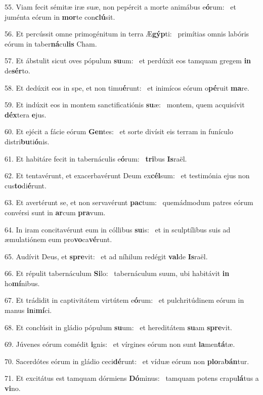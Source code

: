 55. Viam fecit sémitæ iræ suæ, non pepércit a morte animábus e\textbf{ó}rum: \ast\  et juménta eórum in \textbf{mor}te con\textbf{clú}sit.\

56. Et percússit omne primogénitum in terra Æ\textbf{gýp}ti: \ast\  primítias omnis labóris eórum in taber\textbf{ná}cu\textbf{lis} Cham.\

57. Et ábstulit sicut oves pópulum \textbf{su}um: \ast\  et perdúxit eos tamquam gregem \textbf{in} de\textbf{sér}to.\

58. Et dedúxit eos in spe, et non timu\textbf{é}runt: \ast\  et inimícos eórum o\textbf{pé}ruit \textbf{ma}re.\

59. Et indúxit eos in montem sanctificatiónis \textbf{su}æ: \ast\  montem, quem acquisívit \textbf{déx}tera \textbf{e}jus.\

60. Et ejécit a fácie eórum \textbf{Gen}tes: \ast\  et sorte divísit eis terram in funículo distri\textbf{bu}ti\textbf{ó}nis.\

61. Et habitáre fecit in tabernáculis e\textbf{ó}rum: \ast\  \textbf{tri}bus \textbf{Is}raël.\

62. Et tentavérunt, et exacerbavérunt Deum ex\textbf{cél}sum: \ast\  et testimónia ejus non cus\textbf{to}di\textbf{é}runt.\

63. Et avertérunt se, et non servavérunt \textbf{pac}tum: \ast\  quemádmodum patres eórum convérsi sunt in \textbf{ar}cum \textbf{pra}vum.\

64. In iram concitavérunt eum in cóllibus \textbf{su}is: \ast\  et in sculptílibus suis ad æmulatiónem eum pro\textbf{vo}ca\textbf{vé}runt.\

65. Audívit Deus, et \textbf{spre}vit: \ast\  et ad níhilum redégit \textbf{val}de \textbf{Is}raël.\

66. Et répulit tabernáculum \textbf{Si}lo: \ast\  tabernáculum suum, ubi habitávit \textbf{in} ho\textbf{mí}nibus.\

67. Et trádidit in captivitátem virtútem e\textbf{ó}rum: \ast\  et pulchritúdinem eórum in manus \textbf{in}i\textbf{mí}ci.\

68. Et conclúsit in gládio pópulum \textbf{su}um: \ast\  et hereditátem \textbf{su}am \textbf{spre}vit.\

69. Júvenes eórum comédit \textbf{i}gnis: \ast\  et vírgines eórum non sunt \textbf{la}men\textbf{tá}tæ.\

70. Sacerdótes eórum in gládio ceci\textbf{dé}runt: \ast\  et víduæ eórum non \textbf{plo}ra\textbf{bán}tur.\

71. Et excitátus est tamquam dórmiens \textbf{Dó}minus: \ast\  tamquam potens crapu\textbf{lá}tus a \textbf{vi}no.\


